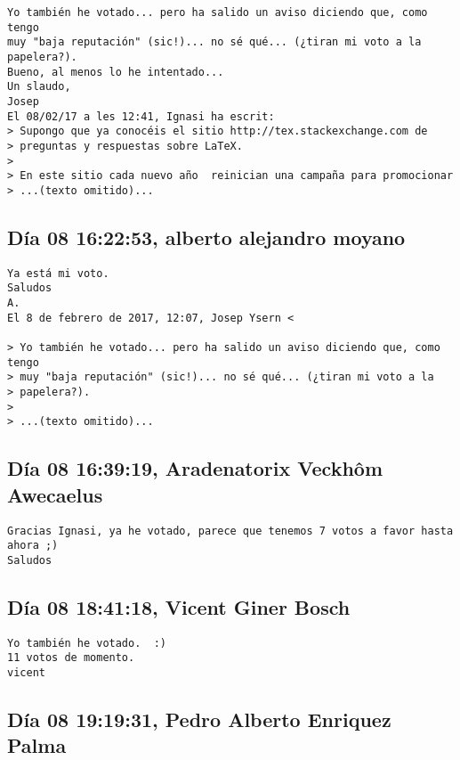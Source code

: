 \documentclass[a4paper,10pt]{article}
\begin{document}
\begin{lstlisting}
Yo también he votado... pero ha salido un aviso diciendo que, como tengo 
muy "baja reputación" (sic!)... no sé qué... (¿tiran mi voto a la 
papelera?).
Bueno, al menos lo he intentado...
Un slaudo,
Josep
El 08/02/17 a les 12:41, Ignasi ha escrit:
> Supongo que ya conocéis el sitio http://tex.stackexchange.com de 
> preguntas y respuestas sobre LaTeX.
>
> En este sitio cada nuevo año  reinician una campaña para promocionar 
> ...(texto omitido)...

\end{lstlisting}

\subsection{Día 08 16:22:53, alberto alejandro moyano}

\begin{lstlisting}
Ya está mi voto.
Saludos
A.
El 8 de febrero de 2017, 12:07, Josep Ysern <

> Yo también he votado... pero ha salido un aviso diciendo que, como tengo
> muy "baja reputación" (sic!)... no sé qué... (¿tiran mi voto a la
> papelera?).
>
> ...(texto omitido)...

\end{lstlisting}

\subsection{Día 08 16:39:19, Aradenatorix Veckhôm Awecaelus}

\begin{lstlisting}
Gracias Ignasi, ya he votado, parece que tenemos 7 votos a favor hasta ahora ;)
Saludos

\end{lstlisting}

\subsection{Día 08 18:41:18, Vicent Giner Bosch}

\begin{lstlisting}
Yo también he votado.  :)
11 votos de momento.
vicent

\end{lstlisting}

\subsection{Día 08 19:19:31, Pedro Alberto Enriquez Palma}
\end{document}

